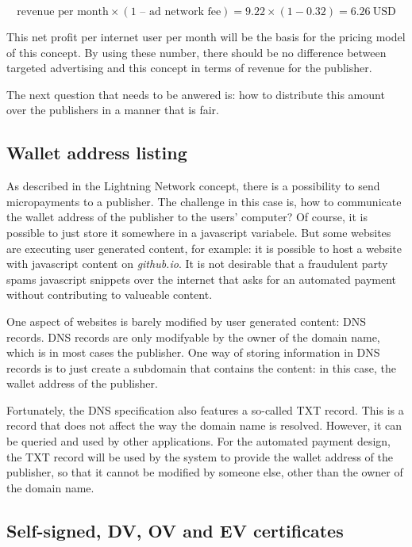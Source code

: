 \begin{equation}
  \text{revenue per month} \times (\text{1 -- ad network fee}) = 9.22 \times (1 - 0.32) = 6.26 ~\text{USD}
\end{equation}


This net profit per internet user per month will be the basis for the pricing model of this concept. By using these number, there should be no difference between targeted advertising and this concept in terms of revenue for the publisher.

The next question that needs to be anwered is: how to distribute this amount over the publishers in a manner that is fair.  




\subsection{Wallet address listing}

As described in the Lightning Network concept, there is a possibility to send micropayments to a publisher. The challenge in this case is, how to communicate the wallet address of the publisher to the users' computer? Of course, it is possible to just store it somewhere in a javascript variabele. But some websites are executing user generated content, for example: it is possible to host a website with javascript content on \textit{github.io}. It is not desirable that a fraudulent party spams javascript snippets over the internet that asks for an automated payment without contributing to valueable content. 

One aspect of websites is barely modified by user generated content: DNS records. DNS records are only modifyable by the owner of the domain name, which is in most cases the publisher. One way of storing information in DNS records is to just create a subdomain that contains the content: in this case, the wallet address of the publisher. 

Fortunately, the DNS specification also features a so-called TXT record. This is a record that does not affect the way the domain name is resolved. However, it can be queried and used by other applications. For the automated payment design, the TXT record will be used by the system to provide the wallet address of the publisher, so that it cannot be modified by someone else, other than the owner of the domain name. 

\subsection{Self-signed, DV, OV and EV certificates}

